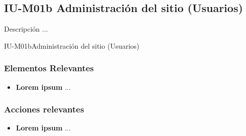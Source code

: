 
\subsection{IU-M01b Administración del sitio (Usuarios)}

 Descripción ...

        {IU-M01b}{Administración del sitio (Usuarios)}

\subsubsection{Elementos Relevantes}

    \begin{itemize}
    \item {\bf Lorem ipsum}
        ...
    \end{itemize}

\subsubsection{Acciones relevantes}

    \begin{itemize}
    \item {\bf Lorem ipsum}
        ...
    \end{itemize}

\clearpage
